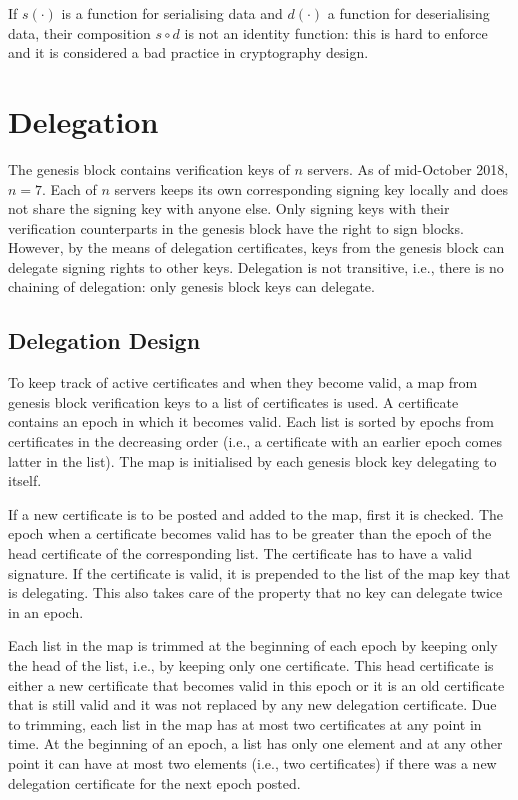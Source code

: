 \documentclass[11pt,a4paper]{article}
\begin{document}
If $s(\cdot)$ is a function for serialising data and $d(\cdot)$ a function for
deserialising data, their composition $s \circ d$ is not an identity function:
%
this is hard to enforce and it is considered a bad practice in cryptography
design.

\section{Delegation}
\label{sec:delegation}

The genesis block contains verification keys of $n$ servers.
%
As of mid-October 2018, $n = 7$.
%
Each of $n$ servers keeps its own corresponding signing key locally and does
not share the signing key with anyone else.
%
Only signing keys with their verification counterparts in the genesis block
have the right to sign blocks.
%
However, by the means of delegation certificates, keys from the genesis block
can delegate signing rights to other keys.
%
Delegation is not transitive, i.e., there is no chaining of delegation:
%
only genesis block keys can delegate.


\subsection{Delegation Design}
\label{sec:delegation-design}

To keep track of active certificates and when they become valid, a map from
genesis block verification keys to a list of certificates is used.
%
A certificate contains an epoch in which it becomes valid.
%
Each list is sorted by epochs from certificates in the decreasing order (i.e.,
a certificate with an earlier epoch comes latter in the list).
%
The map is initialised by each genesis block key delegating to itself.


If a new certificate is to be posted and added to the map, first it is
checked.
%
The epoch when a certificate becomes valid has to be greater than the epoch of
the head certificate of the corresponding list.
%
The certificate has to have a valid signature.
%
If the certificate is valid, it is prepended to the list of the map key that
is delegating.
%
This also takes care of the property that no key can delegate
twice in an epoch.


Each list in the map is trimmed at the beginning of each epoch by keeping only
the head of the list, i.e., by keeping only one certificate.
%
This head certificate is either a new certificate that becomes valid in this
epoch or it is an old certificate that is still valid and it was not replaced
by any new delegation certificate.
%
Due to trimming, each list in the map has at most two certificates at any
point in time.
%
At the beginning of an epoch, a list has only one element and at any other
point it can have at most two elements (i.e., two certificates) if there was a
new delegation certificate for the next epoch posted.
\end{document}
